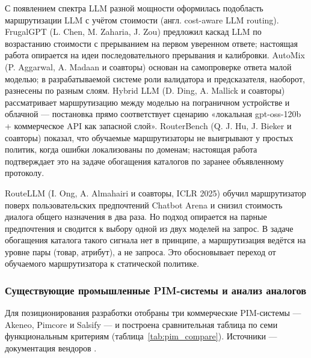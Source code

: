 С появлением спектра LLM разной мощности оформилась подобласть маршрутизации LLM с учётом стоимости (англ. cost-aware LLM routing). FrugalGPT \cite{ref_9} (L. Chen, M. Zaharia, J. Zou) предложил каскад LLM по возрастанию стоимости с прерыванием на первом уверенном ответе; настоящая работа опирается на идеи последовательного прерывания и калибровки. AutoMix \cite{ref_10} (P. Aggarwal, A. Madaan и соавторы) основан на самопроверке ответа малой моделью; в разрабатываемой системе роли валидатора и предсказателя, наоборот, разнесены по разным слоям. Hybrid LLM \cite{ref_11} (D. Ding, A. Mallick и соавторы) рассматривает маршрутизацию между моделью на пограничном устройстве и облачной — постановка прямо соответствует сценарию «локальная gpt-oss-120b + коммерческое API как запасной слой». RouterBench \cite{ref_12} (Q. J. Hu, J. Bieker и соавторы) показал, что обучаемые маршрутизаторы не выигрывают у простых политик, когда ошибки локализованы по доменам; настоящая работа подтверждает это на задаче обогащения каталогов по заранее объявленному протоколу.

RouteLLM \cite{ref_59} (I. Ong, A. Almahairi и соавторы, ICLR 2025) обучил маршрутизатор поверх пользовательских предпочтений Chatbot Arena и снизил стоимость диалога общего назначения в два раза. Но подход опирается на парные предпочтения и сводится к выбору одной из двух моделей на запрос. В задаче обогащения каталога такого сигнала нет в принципе, а маршрутизация ведётся на уровне пары (товар, атрибут), а не запроса. Это обосновывает переход от обучаемого маршрутизатора к статической политике.

\subsubsection{Существующие промышленные PIM-системы и анализ аналогов}
\label{subsubsec:analogs}

Для позиционирования разработки отобраны три коммерческие PIM-системы — Akeneo, Pimcore и Salsify — и построена сравнительная таблица по семи функциональным критериям (таблица~\ref{tab:pim_compare}). Источники — документация вендоров \cite{ref_5, ref_6, ref_7}.

